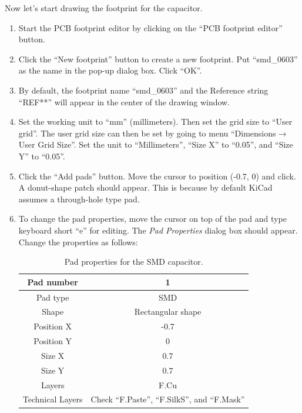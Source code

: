 \documentclass[12pt,letterpaper]{scrartcl}
\begin{document}
Now let's start drawing the footprint for the capacitor. 
\begin{enumerate}
	\item Start the PCB footprint editor by clicking on the ``PCB footprint editor'' button. 
	
	\item Click the ``New footprint'' button to create a new footprint. Put ``smd\_0603'' as the name in the pop-up dialog box. Click ``OK''. 
	
	\item By default, the footprint name ``smd\_0603'' and the Reference string ``REF**'' will appear in the center of the drawing window. 
	
	\item Set the working unit to ``mm'' (millimeters). Then set the grid size to ``User grid''. The user grid size can then be set by going to menu ``Dimensions$\rightarrow$User Grid Size''. Set the unit to ``Millimeters'', ``Size X'' to ``0.05'', and ``Size Y'' to ``0.05''.
	
	\item Click the ``Add pads'' button. Move the cursor to position (-0.7, 0) and click. A donut-shape patch should appear. This is because by default KiCad assumes a through-hole type pad. 
	
	\item To change the pad properties, move the cursor on top of the pad and type keyboard short ``e'' for editing. The \emph{Pad Properties} dialog box should appear. Change the properties as follows:
		\begin{table}[h]
			\centering
			\caption{Pad properties for the SMD capacitor.}
			\renewcommand{\arraystretch}{1.2}
			\small
			\begin{tabular}{|c|c|}
				\hline  Pad number & 1 \\ 
				\hline  Pad type & SMD \\ 
				\hline  Shape & Rectangular shape \\ 
				\hline  Position X & -0.7 \\ 
				\hline  Position Y & 0  \\ 
				\hline  Size X & 0.7 \\ 
				\hline  Size Y & 0.7  \\ 
				\hline  Layers & F.Cu \\ 
				\hline  Technical Layers & Check ``F.Paste'', ``F.SilkS'', and ``F.Mask''  \\ 
				\hline 
			\end{tabular} 
		\end{table}
	

\end{enumerate}
\end{document}
